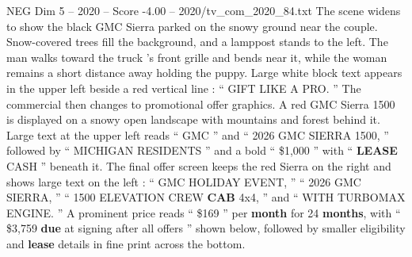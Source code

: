 \begin{textsample}{NEG Dim 5 – 2020 – Score -4.00 – 2020/tv\_com\_2020\_84.txt}
The scene widens to show the black GMC Sierra parked on the snowy ground near the couple.
Snow-covered trees fill the background, and a lamppost stands to the left.
The man walks toward the truck ’s front grille and bends near it, while the woman remains a short distance away holding the puppy.
Large white block text appears in the upper left beside a red vertical line : “ GIFT LIKE A PRO. ” The commercial then changes to promotional offer graphics.
A red GMC Sierra 1500 is displayed on a snowy open landscape with mountains and forest behind it.
Large text at the upper left reads “ GMC ” and “ 2026 GMC SIERRA 1500, ” followed by “ MICHIGAN RESIDENTS ” and a bold “ \$1,000 ” with “ \textbf{LEASE} CASH ” beneath it.
The final offer screen keeps the red Sierra on the right and shows large text on the left : “ GMC HOLIDAY EVENT, ” “ 2026 GMC SIERRA, ” “ 1500 ELEVATION CREW \textbf{CAB} 4x4, ” and “ WITH TURBOMAX ENGINE. ” A prominent price reads “ \$169 ” per \textbf{month} for 24 \textbf{months}, with “ \$3,759 \textbf{due} at signing after all offers ” shown below, followed by smaller eligibility and \textbf{lease} details in fine print across the bottom.

\end{textsample}
